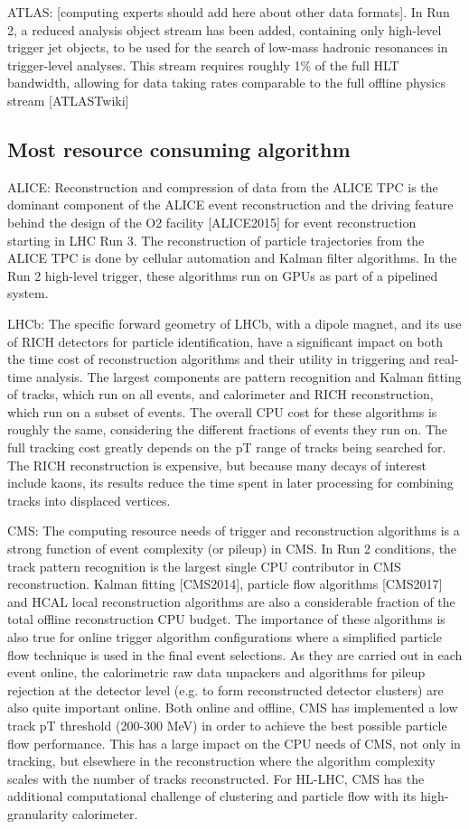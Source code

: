 ATLAS: [computing experts should add here about other data formats]. In Run 2, a reduced analysis object stream has been added, containing only high-level trigger jet objects, to be used for the search of low-mass hadronic resonances in trigger-level analyses. This stream requires roughly 1\% of the full HLT bandwidth, allowing for data taking rates comparable to the full offline physics stream [ATLASTwiki] 

\subsection{Most resource consuming algorithm}
ALICE: Reconstruction and compression of data from the ALICE TPC is the dominant component of the ALICE event reconstruction and the driving feature behind the design of the O2 facility [ALICE2015] for event reconstruction starting in LHC Run 3. The reconstruction of particle trajectories from the ALICE TPC is done by cellular automation and Kalman filter algorithms. In the Run 2 high-level trigger, these algorithms run on GPUs as part of a pipelined system.

LHCb: The specific forward geometry of LHCb, with a dipole magnet, and its use of RICH detectors for particle identification, have a significant impact on both the time cost of reconstruction algorithms and their utility in triggering and real-time analysis. The largest components are pattern recognition and Kalman fitting of tracks, which run on all events, and calorimeter and RICH reconstruction, which run on a subset of events. The overall CPU cost for these algorithms is roughly the same, considering the different fractions of events they run on. The full tracking cost greatly depends on the pT range of tracks being searched for. The RICH reconstruction is expensive, but because many decays of interest include kaons, its results reduce the time spent in later processing for combining tracks into displaced vertices.

CMS: The computing resource needs of trigger and reconstruction algorithms is a strong function of event complexity (or pileup) in CMS. In Run 2 conditions, the track pattern recognition is the largest single CPU contributor in CMS reconstruction. Kalman fitting [CMS2014], particle flow algorithms [CMS2017] and HCAL local reconstruction algorithms are also a considerable fraction of the total offline reconstruction CPU budget. The importance of these algorithms is also true for online trigger algorithm configurations where a simplified particle flow technique is used in the final event selections. As they are carried out in each event online, the calorimetric raw data unpackers and algorithms for pileup rejection at the detector level (e.g. to form reconstructed detector clusters) are also quite important online. Both online and offline, CMS has implemented a low track pT threshold (200-300 MeV) in order to achieve the best possible particle flow performance. This has a large impact on the CPU needs of CMS, not only in tracking, but elsewhere in the reconstruction where the algorithm complexity scales with the number of tracks reconstructed. For HL-LHC, CMS has the additional computational challenge of clustering and particle flow with its high-granularity calorimeter.

